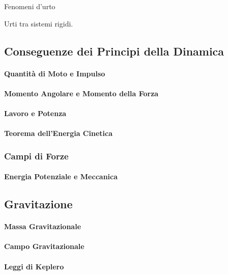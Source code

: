 Fenomeni d'urto

Urti tra sistemi rigidi. 


\subsection{Conseguenze dei Principi della Dinamica}

\paragraph{Quantità di Moto e Impulso}
\paragraph{Momento Angolare e Momento della Forza}
\paragraph{Lavoro e Potenza}
\paragraph{Teorema dell'Energia Cinetica}
\subsubsection{Campi di Forze}
\paragraph{Energia Potenziale e Meccanica}


\subsection{Gravitazione}
\paragraph{Massa Gravitazionale}
\paragraph{Campo Gravitazionale}
\paragraph{Leggi di Keplero}



